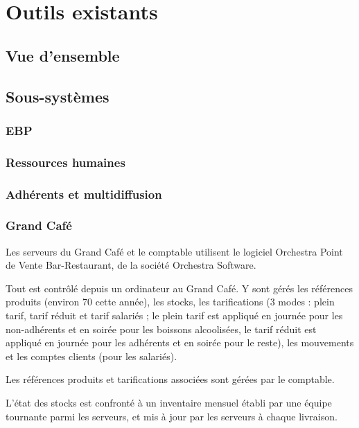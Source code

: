 \section{Outils existants}
\subsection{Vue d'ensemble}



\subsection{Sous-systèmes}

\subsubsection{EBP}

\subsubsection{Ressources humaines}

\subsubsection{Adhérents et multidiffusion}

\subsubsection{Grand Café}

Les serveurs du Grand Café et le comptable utilisent le logiciel Orchestra
Point de Vente Bar-Restaurant, de la société Orchestra Software.

Tout est contrôlé depuis un ordinateur au Grand Café. Y sont gérés les
références produits (environ 70 cette année), les stocks, les tarifications
(3 modes : plein tarif, tarif réduit et tarif salariés ; le plein tarif
est appliqué en journée pour les non-adhérents et en soirée pour les boissons
alcoolisées, le tarif réduit est appliqué en journée pour les adhérents
et en soirée pour le reste), les mouvements et les comptes clients (pour les
salariés).

Les références produits et tarifications associées sont gérées par le comptable.

L'état des stocks est confronté à un inventaire mensuel établi par une équipe
tournante parmi les serveurs, et mis à jour par les serveurs à chaque
livraison.

